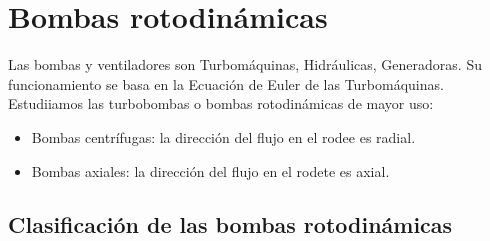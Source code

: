 \section{Bombas rotodinámicas}
Las bombas y ventiladores son Turbomáquinas, Hidráulicas, Generadoras. Su funcionamiento se basa en la Ecuación de Euler de las Turbomáquinas. Estudiiamos las turbobombas o bombas rotodinámicas de mayor uso:
\begin{itemize}
    \item Bombas centrífugas: la dirección del flujo en el rodee es radial.
    \item Bombas axiales: la dirección del flujo en el rodete es axial.
\end{itemize}

\subsection{Clasificación de las bombas rotodinámicas}
